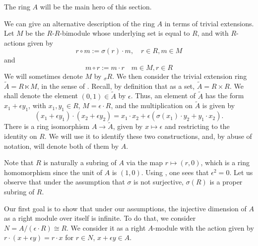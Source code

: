\documentclass{amsart}
\theoremstyle{definition}
\def\skewtimes{\ltimes\!}
\numberwithin{equation}{section}
\begin{document}
The ring $A$ will be the main hero of this section.

We can give an alternative description of the ring $A$ in terms of trivial extensions. Let $M$ be the $R$-$R$-bimodule whose underlying set is equal to $R$, and with $R$-actions given by 
\[
r\circ m := \sigma(r) \cdot m,  \quad r\in R, m \in M
\]
and
\[
m \circ r := m\cdot r \quad m \in M, r \in R
\]
We will sometimes denote $M$ by $\phantom{ }_{\sigma} R$.
We then consider the trivial extension ring $\widetilde{A} = R \skewtimes M$, in the sense of \cite{TExtBook}. 
Recall, by definition that as a set, $\widetilde{A} = R\times R$.
We shall denote the element $(0,1) \in \widetilde{A}$ by $\epsilon$.
Thus, an element of $\widetilde{A}$ has the form $x_1 + \epsilon y_1$, with $x_1,y_1 \in R$,
$M = \epsilon\cdot R$,
and the multiplication on $\widetilde{A}$ is given by
\begin{equation}\label{eqn:multA}
(x_1 + \epsilon y_1) \cdot (x_2 + \epsilon y_2) = x_1\cdot x_2 + \epsilon(\sigma(x_1)\cdot y_2+ y_1\cdot x_2).
\end{equation}
There is a ring isomorphism $A \to \widetilde{A}$,
given by $x\mapsto \epsilon$ and restricting to the identity on $R$. We will use it to identify these two constructions,
and, by abuse of notation, will denote both of them by $A$.

Note that $R$ is naturally a subring of $A$ via the map $r \mapsto (r,0)$,
which is a ring homomorphism since the unit of $A$ is $(1,0)$.
Using , one sees that $\epsilon^2 = 0$.
Let us observe that under the assumption that $\sigma$ is not surjective, $\sigma(R)$ is a proper subring of $R$.

Our first goal is to show that under our assumptions, 
the injective dimension of $A$ as a right module over itself is infinite.
To do that, we consider $N = A/(\epsilon\cdot R) \cong R$.
We consider it as a right $A$-module with the action given by
$r \cdot (x+\epsilon y) = r\cdot x$ for $r \in N$, $x+\epsilon y \in A$.
\end{document}
